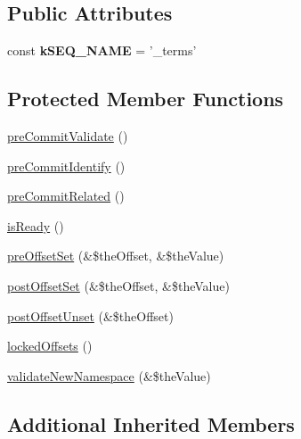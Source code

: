 \subsection*{Public Attributes}
\begin{DoxyCompactItemize}
\item 
\hypertarget{class_ontology_wrapper_1_1_term_a5731878c2b563dbc2be121ba29fa7086}{const {\bfseries k\-S\-E\-Q\-\_\-\-N\-A\-M\-E} = '\-\_\-terms'}\label{class_ontology_wrapper_1_1_term_a5731878c2b563dbc2be121ba29fa7086}

\end{DoxyCompactItemize}
\subsection*{Protected Member Functions}
\begin{DoxyCompactItemize}
\item 
\hyperlink{class_ontology_wrapper_1_1_term_a76df6c7422a0f08970ccb06ec986ff10}{pre\-Commit\-Validate} ()
\item 
\hyperlink{class_ontology_wrapper_1_1_term_abb685a7d0c423b6f69f0e8ff741b02ac}{pre\-Commit\-Identify} ()
\item 
\hyperlink{class_ontology_wrapper_1_1_term_a3b51582361305a0741b35098c629347f}{pre\-Commit\-Related} ()
\item 
\hyperlink{class_ontology_wrapper_1_1_term_ae1c796d23d15f49b132025b268c5763b}{is\-Ready} ()
\item 
\hyperlink{class_ontology_wrapper_1_1_term_af8a6e2e4534d0907d5ad8bc719972b74}{pre\-Offset\-Set} (\&\$the\-Offset, \&\$the\-Value)
\item 
\hyperlink{class_ontology_wrapper_1_1_term_aa59636200bca2de1b23380a6376f65df}{post\-Offset\-Set} (\&\$the\-Offset, \&\$the\-Value)
\item 
\hyperlink{class_ontology_wrapper_1_1_term_af6d43299cf5932b581548aaf5a8515d9}{post\-Offset\-Unset} (\&\$the\-Offset)
\item 
\hyperlink{class_ontology_wrapper_1_1_term_a174e341c129088cdc8b845e0176d6eb4}{locked\-Offsets} ()
\item 
\hyperlink{class_ontology_wrapper_1_1_term_a84d69a697d82cc5fa8c4e4e0a1096852}{validate\-New\-Namespace} (\&\$the\-Value)
\end{DoxyCompactItemize}
\subsection*{Additional Inherited Members}


